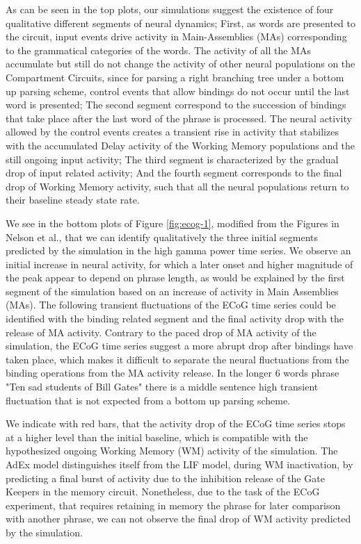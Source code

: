 \documentclass[10pt]{article}
\begin{document}
As can be seen in the top plots, our simulations suggest the existence of four qualitative different segments of neural dynamics;
First, as words are presented to the circuit, input events drive activity in Main-Assemblies (MAs) corresponding to the grammatical categories of the words.
The activity of all the MAs accumulate but still do not change the activity of other neural populations on the Compartment Circuits, since for parsing a right branching tree under a bottom up parsing scheme, control events that allow bindings do not occur until the last word is presented;
The second segment correspond to the succession of bindings that take place after the last word of the phrase is processed.
The neural activity allowed by the control events creates a transient rise in activity that stabilizes with the accumulated Delay activity of the Working Memory populations and the still ongoing input activity;
The third segment is characterized by the gradual drop of input related activity;
And the fourth segment corresponds to the final drop of Working Memory activity, such that all the neural populations return to their baseline steady state rate.

We see in the bottom plots of Figure \ref{fig:ecog-1}, modified from the Figures in Nelson et al., that we can identify qualitatively the three initial segments predicted by the simulation in the high gamma power time series.
We observe an initial increase in neural activity, for which a later onset and higher magnitude of the peak appear to depend on phrase length, as would be explained by the first segment of the simulation based on an increase of activity in Main Assemblies (MAs).
The following transient fluctuations of the ECoG time series could be identified with the binding related segment and the final activity drop with the release of MA activity.
Contrary to the paced drop of MA activity of the simulation, the ECoG time series suggest a more abrupt drop after bindings have taken place, which makes it difficult to separate the neural fluctuations from the binding operations from the MA activity release.
In the longer 6 words phrase "Ten sad students of Bill Gates" there is a middle sentence high transient fluctuation that is not expected from a bottom up parsing scheme.

We indicate with red bars, that the activity drop of the ECoG time series stops at a higher level than the initial baseline, which is compatible with the hypothesized ongoing Working Memory (WM) activity of the simulation.
The AdEx model distinguishes itself from the LIF model, during WM inactivation, by predicting a final burst of activity due to the inhibition release of the Gate Keepers in the memory circuit.
Nonetheless, due to the task of the ECoG experiment, that requires retaining in memory the phrase for later comparison with another phrase, we can not observe the final drop of WM activity predicted by the simulation.
\end{document}
